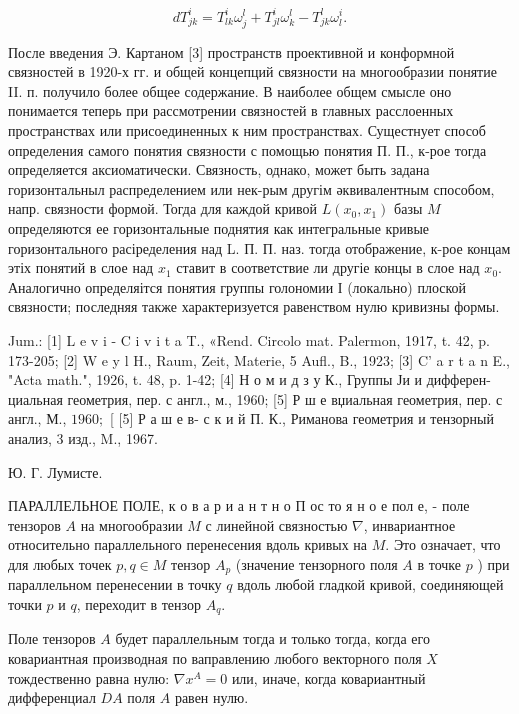 \documentclass[10pt]{article}
\begin{document}
\[
d T_{j k}^{i}=T_{l k}^{i} \omega_{j}^{l}+T_{j l}^{i} \omega_{k}^{l}-T_{j k}^{l} \omega_{l}^{i} .
\]

После введения Э. Картаном [3] пространств проективной и конформной связностей в 1920-х гг. и общей концепций связности на многообразии понятие II. п. получило более общее содержание. В наиболее общем смысле оно понимается теперь при рассмотрении связностей в главных расслоенных пространствах или присоединенных к ним пространствах. Сущестнует способ определения самого понятия связности с помощью понятия П. П., к-рое тогда определяется аксиоматически. Связность, однако, может быть задана горизонтальныл распределением или нек-рым другім әквивалентным способом, напр. связности формой. Тогда для каждой кривой $L\left(x_{0}, x_{1}\right)$ базы $M$ определяются ее горизонтальные поднятия как интегральные кривые горизонтального расіределения над L. П. П. наз. тогда отображение, к-рое концам этіх понятий в слое над $x_{1}$ ставит в соответствие ли другіе концы в слое над $x_{0}$. Аналогично определяітся понятия группы голономии І (локально) плоской связности; последняя также характеризуется равенством нулю кривизны формы.

Jum.: [1] L e v i - C i v i t a T., «Rend. Circolo mat. Palermon, 1917, t. 42, p. 173-205; [2] W e y l H., Raum, Zeit, Materie, 5 Aufl., B., 1923; [3] C' a r t a n E., "Acta math.", 1926, t. 48, p. 1-42; [4] Н о м и д з у К., Группы Ји и дифферен-
циальная геометрия, пер. с англ., м., 1960; [5] Р ш е вџиальная геометрия, пер. с англ., М., $1960 ;$ [ [5] Р а ш е в-
с к и й П. К., Риманова геометрия и тензорный анализ, 3 изд., M., 1967.

Ю. Г. Лумисте.

ПАРАЛЛЕЛЬНОЕ ПОЛЕ, к о в а р и а н т н о П ос то я н о е пол е, - поле тензоров $A$ на многообразии $M$ с линейной связностью $\nabla$, инвариантное относительно параллельного перенесения вдоль кривых на $M$. Это означает, что для любых точек $p, q \in M$ тензор $A_{p}$ (значение тензорного поля $A$ в точке $p$ ) при параллельном перенесении в точку $q$ вдоль любой гладкой кривой, соединяющей точки $p$ и $q$, переходит в тензор $A_{q}$.

Поле тензоров $A$ будет параллельным тогда и только тогда, когда его ковариантная производная по ваправлению любого векторного поля $X$ тождественно равна нулю: $\nabla x^{A}=0$ или, иначе, когда ковариантный дифференциал $D A$ поля $A$ равен нулю.
\end{document}
